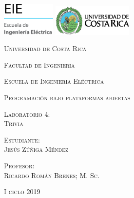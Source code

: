 \begin{titlepage}
		\bf
		\centering
		\includegraphics[width=0.20\textwidth]{images/EIE.png}			
		\hspace{7cm} 
		\includegraphics[width=0.30\textwidth]{images/UCR.png}	
		\par
		\vspace{2cm}			
		{\scshape\large Universidad de Costa Rica \par}
		\vspace{0.6cm}
		{\scshape\large Facultad de Ingenieria\par}
		\vspace{0.6cm}
		{\scshape\large Escuela de Ingenieria Eléctrica\par}
		\vspace{0.6cm}
		{\scshape\large Programación bajo plataformas abiertas\par}
		\vspace{1.5cm}		
		{\scshape\large Laboratorio 4:\\ Trivia \par}
		\vspace{2.5cm}		
		{\scshape\large Estudiante:\\ Jesús Zúñiga Méndez \par}
		\vspace{2.5cm}		
		{\scshape\large Profesor:\\ Ricardo Román Brenes; M. Sc. \par}
		\vspace{2.5cm}
		{\scshape\large I ciclo 2019 \par}
\end{titlepage}
